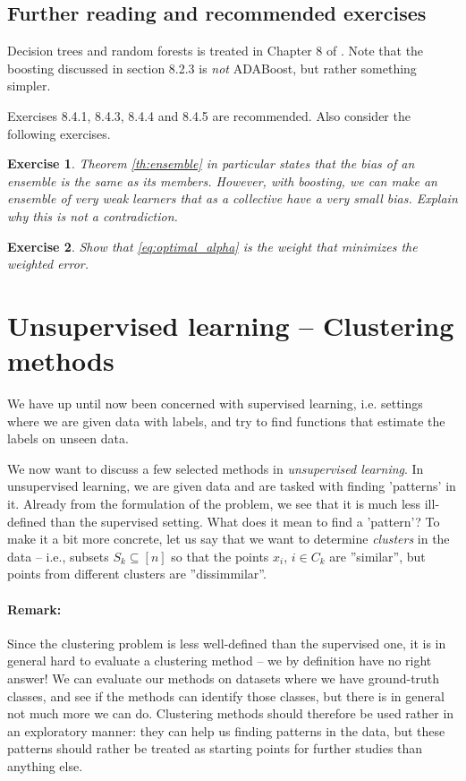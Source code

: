 \documentclass{article}
\newcommand{\sse}{\subseteq}
\newtheorem{exercise}{Exercise}
\begin{document}
\subsection{Further reading and recommended exercises}
Decision trees and random forests is treated in Chapter 8 of \cite{james2023introduction}. Note that the boosting discussed in section 8.2.3 is \emph{not} ADABoost, but rather something simpler.

Exercises 8.4.1, 8.4.3, 8.4.4 and 8.4.5 are recommended. Also consider the following exercises.

\begin{exercise}
    Theorem \ref{th:ensemble} in particular states that the bias of an ensemble is the same as its members. However, with boosting, we can make an ensemble of very weak learners that as a collective have a very small bias. Explain why this is not a contradiction.  
\end{exercise}

\begin{exercise}
    Show that \eqref{eq:optimal_alpha} is the weight that minimizes the weighted error.
\end{exercise}







\section{Unsupervised learning -- Clustering methods}  
We have up until now been concerned with supervised learning, i.e. settings where we are given data with labels, and try to find functions that estimate the labels on unseen data.

We now want to discuss a few selected methods in \emph{unsupervised learning}. In unsupervised learning, we are given data and are tasked with finding 'patterns' in it. Already from the formulation of the problem, we see that it is much less ill-defined than the supervised setting. What does it mean to find a 'pattern'? To make it a bit more concrete, let us say that we want to determine \emph{clusters} in the data -- i.e., subsets $S_k\sse [n]$ so that the points $x_i$, $i\in C_k$ are ''similar'', but points from different clusters are ''dissimmilar''.

\paragraph{Remark:} Since the clustering problem is less well-defined than the supervised one, it is in general hard to evaluate a clustering method -- we by definition have no right answer! We can evaluate our methods on datasets where we have ground-truth classes, and see if the methods can identify those classes, but there is in general not much more we can do. Clustering methods should therefore be used rather in an exploratory manner: they can help us finding patterns in the data, but these patterns should rather be treated as starting points for further studies than anything else. \newline
\end{document}
